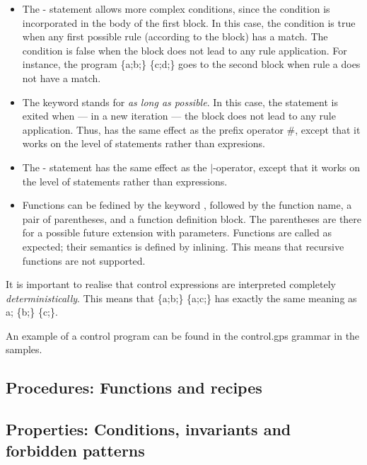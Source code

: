 \begin{itemize}
\item The \tryK-\elseK{} statement allows more complex conditions, since the
  condition is incorporated in the body of the first block. In this case, the
  condition is true when any first possible rule (according to the block) has a
  match. The condition is false when the block does not lead to any rule
  application.  For instance, the program \textsf{\tryK{} \{a;b;\}
  \elseK{} \{c;d;\}} goes to the second block when rule \textsf{a}
  does not have a match.

\item The \alapK{} keyword stands for \emph{as long as possible}. In this case,
  the statement is exited when --- in a new iteration --- the block does not
  lead to any rule application. Thus, \alapK{} has the same effect as the
  prefix operator \textsf{\#}, except that it works on the level of statements
  rather than expresions.

\item The \choiceK-\doK{} statement has the same effect as the
  \textsf{$|$}-operator, except that it works on the level of statements rather
  than expressions.

\item Functions can be fedined by the keyword \functionK, followed by the
  function name, a pair of parentheses, and a function definition block. The
  parentheses are there for a possible future extension with
  parameters. Functions are called as expected; their semantics is defined by
  inlining. This means that recursive functions are not supported.
\end{itemize}
%
It is important to realise that control expressions are interpreted completely
\emph{deterministically}. This means that \textsf{\choiceK{} \{a;b;\} \orK{}
\{a;c;\}} has exactly the same meaning as \textsf{a; \choiceK{} \{b;\} \orK{}
\{c;\}}.

An example of a control program can be found in the \textsf{control.gps}
grammar in the \GROOVE samples.

\subsection{Procedures: Functions and recipes}

\subsection{Properties: Conditions, invariants and forbidden patterns}



